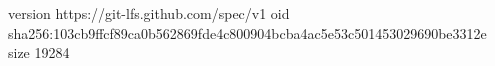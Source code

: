 version https://git-lfs.github.com/spec/v1
oid sha256:103cb9ffcf89ca0b562869fde4c800904bcba4ac5e53c501453029690be3312e
size 19284
